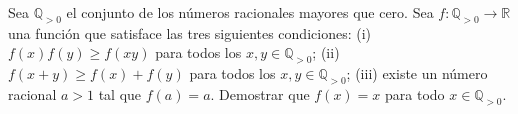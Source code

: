 Sea $\mathbb{Q}_{>0}$ el conjunto de los números racionales mayores que cero. Sea $f : \mathbb{Q}_{\gt 0} \to \mathbb{R}$ una función que satisface las tres siguientes condiciones: \newline 
(i) $f(x)f(y) \geq f(xy)$ para todos los $x,y \in \mathbb{Q}_{>0}$; \newline 
(ii) $f(x+y)\geq f(x)+f(y)$ para todos los $x,y \in \mathbb{Q}_{>0}$; \newline 
(iii) existe un número racional $a > 1$ tal que $f(a) = a$.  \newline 
Demostrar que $f(x) = x$ para todo $x \in \mathbb{Q}_{>0}$.